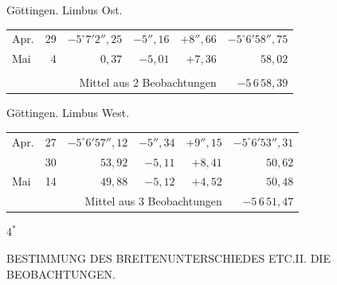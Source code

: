 \noindent\begin{minipage}[t]{.495\textwidth}\centering Göttingen. Limbus Ost.\par\smallskip
{\scriptsize\setlength{\tabcolsep}{1pt}\renewcommand{\arraystretch}{1.2}\begin{tabular}{lr|r|r|r|r|}
Apr.&29&$-5^\circ7'2''{,}25$&$-5''{,}16$&$+8''{,}66$&$-5^\circ6'58''{,}75$\\
Mai&4&$0{,}37$&$-5{,}01$&$+7{,}36$&$58{,}02$\\
&&&&&\\
\cline{6-6}\multicolumn{5}{r}{Mittel aus 2 Beobachtungen}&$-5\,6\,58{,}39$
\end{tabular}}\end{minipage}\hfill\begin{minipage}[t]{.495\textwidth}\centering Göttingen. Limbus West.\par\smallskip
{\scriptsize\setlength{\tabcolsep}{1pt}\renewcommand{\arraystretch}{1.2}\begin{tabular}{lr|r|r|r|r}
Apr.&27&$-5^\circ6'57''{,}12$&$-5''{,}34$&$+9''{,}15$&$-5^\circ6'53''{,}31$\\
&30&$53{,}92$&$-5{,}11$&$+8{,}41$&$50{,}62$\\
Mai&14&$49{,}88$&$-5{,}12$&$+4{,}52$&$50{,}48$\\
\cline{6-6}\multicolumn{5}{r}{Mittel aus 3 Beobachtungen}&$-5\,6\,51{,}47$
\end{tabular}}\end{minipage}
\par\vspace{4mm}
\begin{flushright}$4^{\ast}$\end{flushright}

\clearpage
\noindent{}\parbox[t]{\dimexpr\textwidth-10mm\relax}{\centering\scriptsize BESTIMMUNG DES BREITENUNTERSCHIEDES ETC.\quad II. DIE BEOBACHTUNGEN.}\par


